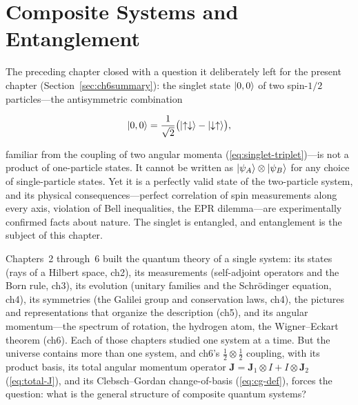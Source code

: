 \chapter{Composite Systems and Entanglement}

The preceding chapter closed with a question it deliberately left for the present chapter (Section~\ref{sec:ch6summary}): the singlet state $\ket{0,0}$ of two spin-$1/2$ particles---the antisymmetric combination
\begin{linenomath}
\begin{equation}
\ket{0,0} = \frac{1}{\sqrt{2}}\bigl(\ket{\uparrow\downarrow} - \ket{\downarrow\uparrow}\bigr),
\end{equation}
\end{linenomath}
familiar from the coupling of two angular momenta (\eqref{eq:singlet-triplet})---is not a product of one-particle states. It cannot be written as $\ket{\psi_A}\otimes\ket{\psi_B}$ for any choice of single-particle states. Yet it is a perfectly valid state of the two-particle system, and its physical consequences---perfect correlation of spin measurements along every axis, violation of Bell inequalities, the EPR dilemma---are experimentally confirmed facts about nature. The singlet is entangled, and entanglement is the subject of this chapter.

Chapters~2 through~6 built the quantum theory of a single system: its states (rays of a Hilbert space, ch2), its measurements (self-adjoint operators and the Born rule, ch3), its evolution (unitary families and the Schr\"odinger equation, ch4), its symmetries (the Galilei group and conservation laws, ch4), the pictures and representations that organize the description (ch5), and its angular momentum---the spectrum of rotation, the hydrogen atom, the Wigner--Eckart theorem (ch6). Each of those chapters studied one system at a time. But the universe contains more than one system, and ch6's $\tfrac12 \otimes \tfrac12$ coupling, with its product basis, its total angular momentum operator $\bm J = \bm J_1 \otimes I + I \otimes \bm J_2$ (\eqref{eq:total-J}), and its Clebsch--Gordan change-of-basis (\eqref{eq:cg-def}), forces the question: what is the general structure of composite quantum systems?


